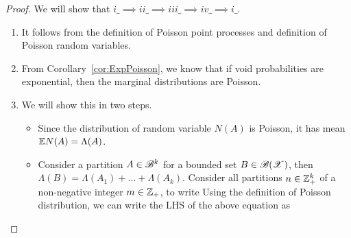\documentclass[letterpaper,10pt,english]{article}
\begin{document}
\begin{proof}
We will show that $i\_ \implies ii\_ \implies iii\_ \implies iv\_ \implies i\_$. 
\begin{enumerate}
	\item[$i \implies ii\_$] It follows from the definition of Poisson point processes and definition of Poisson random variables.  
	\item[$ii \implies iii\_$] 
	From Corollary~\ref{cor:ExpPoisson}, we know that if void probabilities are exponential, then the marginal distributions are Poisson. 
\item[$iii \implies iv\_$] We will show this in two steps. 
\begin{itemize}
\item[Mean:] Since the distribution of random variable $N(A)$ is Poisson, it has mean $\mathbb{E} N(A) = \Lambda(A)$. 
\item[CIP: ] Consider a partition $A \in \mathscr{B}^k$ for a bounded set $B\in\mathscr{B}(\mathscr{X})$, then 
$\Lambda(B) = \Lambda(A_1) + \dots + \Lambda(A_k)$. 
Consider all partitions $n\in\mathbb{Z}_+^k$ of a non-negative integer $m \in \mathbb{Z}_+$, to write 
Using the definition of Poisson distribution, we can write the LHS of the above equation as 

\end{itemize}
\end{enumerate}
\end{proof}
\end{document}
